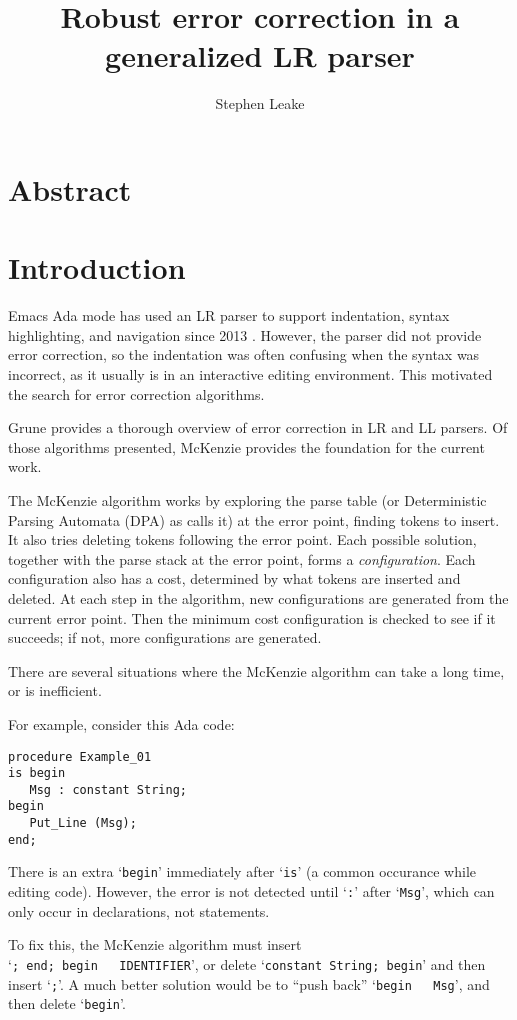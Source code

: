 \documentclass{article}
\title{Robust error correction in a generalized LR parser}
\author{Stephen Leake}
\newcommand{\code}[1]{`\lstinline|#1|'}
\begin{document}
\section{Abstract}

\section{Introduction}
Emacs Ada mode has used an LR parser to support indentation, syntax
highlighting, and navigation since 2013 \cite{Emacs Ada mode news}.
However, the parser did not provide error correction, so the
indentation was often confusing when the syntax was incorrect, as it
usually is in an interactive editing environment. This motivated the
search for error correction algorithms.

Grune \cite{Grune 2008} provides a thorough overview of error correction in
LR and LL parsers. Of those algorithms presented, McKenzie \cite{McKenzie 1995}
provides the foundation for the current work.

The McKenzie algorithm works by exploring the parse table (or
Deterministic Parsing Automata (DPA) as \cite{McKenzie 1995} calls it)
at the error point, finding tokens to insert. It also tries deleting
tokens following the error point. Each possible solution, together
with the parse stack at the error point, forms a
\textit{configuration}. Each configuration also has a cost, determined
by what tokens are inserted and deleted. At each step in the
algorithm, new configurations are generated from the current error
point. Then the minimum cost configuration is checked to see if it
succeeds; if not, more configurations are generated.

There are several situations where the McKenzie algorithm can take a
long time, or is inefficient.

For example, consider this Ada code:
\begin{lstlisting}
procedure Example_01
is begin
   Msg : constant String;
begin
   Put_Line (Msg);
end;
\end{lstlisting}

There is an extra \code{begin} immediately after \code{is} (a common
occurance while editing code). However, the error is not detected
until \code{:} after \code{Msg}, which can only occur in declarations,
not statements.

To fix this, the McKenzie algorithm must insert\\ \code{; end; begin
  IDENTIFIER}, or delete \code{constant String; begin} and then insert
\code{;}. A much better solution would be to ``push back'' \code{begin
  Msg}, and then delete \code{begin}.
\end{document}
